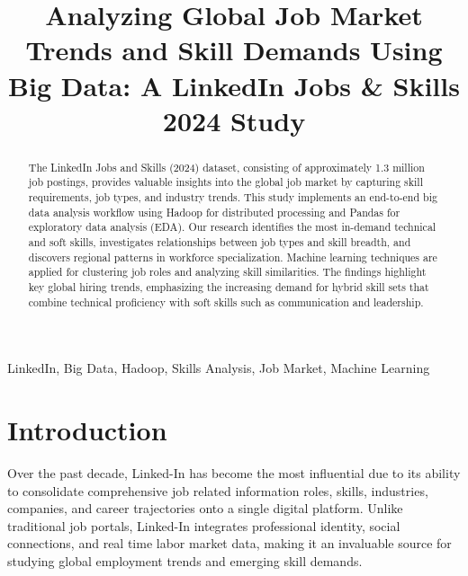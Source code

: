 \documentclass[conference]{IEEEtran}
\begin{document}
\title{Analyzing Global Job Market Trends and Skill Demands Using Big Data: A LinkedIn Jobs \& Skills 2024 Study}

\author{
\and
{}
\and
{}
}

\maketitle


\begin{abstract}
The LinkedIn Jobs and Skills (2024) dataset, consisting of approximately 1.3 million job postings, provides valuable insights into the global job market by capturing skill requirements, job types, and industry trends. This study implements an end-to-end big data analysis workflow using Hadoop for distributed processing and Pandas for exploratory data analysis (EDA). Our research identifies the most in-demand technical and soft skills, investigates relationships between job types and skill breadth, and discovers regional patterns in workforce specialization. Machine learning techniques are applied for clustering job roles and analyzing skill similarities. The findings highlight key global hiring trends, emphasizing the increasing demand for hybrid skill sets that combine technical proficiency with soft skills such as communication and leadership.
\end{abstract}

\begin{IEEEkeywords}
LinkedIn, Big Data, Hadoop, Skills Analysis, Job Market, Machine Learning
\end{IEEEkeywords}

\section{Introduction}
Over the past decade, Linked-In has become the most influential due to its ability to consolidate comprehensive job related information roles, skills, industries, companies, and career trajectories onto a single digital platform. Unlike traditional job portals, Linked-In integrates professional identity, social connections, and real time labor market data, making it an invaluable source for studying global employment trends and emerging skill demands. 
\end{document}
